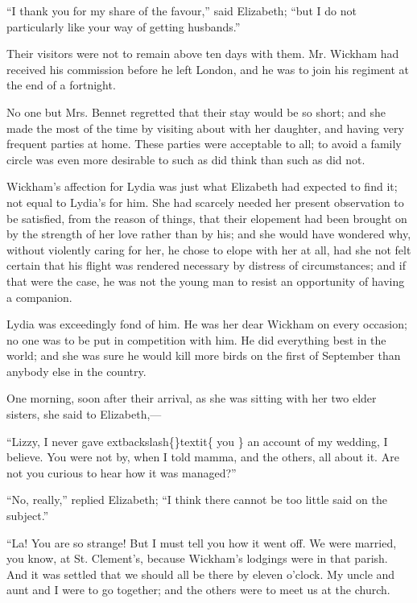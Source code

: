 \documentclass[10pt]{book}
\begin{document}
   “I thank you for my share of the favour,” said Elizabeth; “but I do not
particularly like your way of getting husbands.”
  

   Their visitors were not to remain above ten days with them. Mr. Wickham
had received his commission before he left London, and he was to join
his regiment at the end of a fortnight.
  

   No one but Mrs. Bennet regretted that their stay would be so short; and
she made the most of the time by visiting about with her daughter, and
having very frequent parties at home. These parties were acceptable to
all; to avoid a family circle was even more desirable to such as did
think than such as did not.
  

   Wickham’s affection for Lydia was just what Elizabeth had expected to
find it; not equal to Lydia’s for him. She had scarcely needed her
present observation to be satisfied, from the reason of things, that
their elopement had been brought on by the strength of her love rather
than by his; and she would have wondered why, without violently caring
for her, he chose to elope with her at all, had she not felt certain
that his flight was rendered necessary by distress of circumstances; and
if that were the case, he was not the young man to resist an opportunity
of having a companion.
  

   Lydia was exceedingly fond of him. He was her dear Wickham on every
occasion; no one was to be put in competition with him. He did
everything best in the world; and she was sure he would kill more
   birds
on the first of September than anybody else in the country.
  

   One morning, soon after their arrival, as she was sitting with her two
elder sisters, she said to Elizabeth,—
  

   “Lizzy, I never gave
   	extbackslash\{\}textit\{
    you
   \}
   an account of my wedding, I believe. You were
not by, when I told mamma, and the others, all about it. Are not you
curious to hear how it was managed?”
  

   “No, really,” replied Elizabeth; “I think there cannot be too little
said on the subject.”
  

   “La! You are so strange! But I must tell you how it went off. We were
married, you know, at St. Clement’s, because Wickham’s lodgings were in
that parish. And it was settled that we should all be there by eleven
o’clock. My uncle and aunt and I were to go together; and the others
were to meet us at the church.
  
\end{document}
